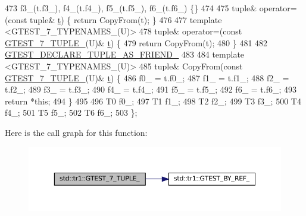 \begin{DoxyCode}
473       f3\_(t.f3\_), f4\_(t.f4\_), f5\_(t.f5\_), f6\_(t.f6\_) \{\}
474 
475   tuple& operator=(\textcolor{keyword}{const} tuple& \hyperlink{namespacebattery__monitor__node_a7a63d20d1ea461e280f4eb5b47f925cd}{t}) \{ \textcolor{keywordflow}{return} CopyFrom(t); \}
476 
477   \textcolor{keyword}{template} <GTEST\_7\_TYPENAMES\_(U)>
478   tuple& operator=(\textcolor{keyword}{const} \hyperlink{gtest-tuple_8h_a8987baf82ee028d1d778447413a02c0c}{GTEST\_7\_TUPLE\_}(U)& \hyperlink{namespacebattery__monitor__node_a7a63d20d1ea461e280f4eb5b47f925cd}{t}) \{
479     \textcolor{keywordflow}{return} CopyFrom(t);
480   \}
481 
482   \hyperlink{gtest-tuple_8h_a2b20671273f514a88a6e9b8328e5f257}{GTEST\_DECLARE\_TUPLE\_AS\_FRIEND\_}
483 
484   \textcolor{keyword}{template} <GTEST\_7\_TYPENAMES\_(U)>
485   tuple& CopyFrom(\textcolor{keyword}{const} \hyperlink{gtest-tuple_8h_a8987baf82ee028d1d778447413a02c0c}{GTEST\_7\_TUPLE\_}(U)& \hyperlink{namespacebattery__monitor__node_a7a63d20d1ea461e280f4eb5b47f925cd}{t}) \{
486     f0\_ = t.f0\_;
487     f1\_ = t.f1\_;
488     f2\_ = t.f2\_;
489     f3\_ = t.f3\_;
490     f4\_ = t.f4\_;
491     f5\_ = t.f5\_;
492     f6\_ = t.f6\_;
493     \textcolor{keywordflow}{return} *\textcolor{keyword}{this};
494   \}
495 
496   T0 f0\_;
497   T1 f1\_;
498   T2 f2\_;
499   T3 f3\_;
500   T4 f4\_;
501   T5 f5\_;
502   T6 f6\_;
503 \};
\end{DoxyCode}
Here is the call graph for this function\+:
\nopagebreak
\begin{figure}[H]
\begin{center}
\leavevmode
\includegraphics[width=350pt]{namespacestd_1_1tr1_ab451b390a95ee0555d7a43b67ea348aa_cgraph}
\end{center}
\end{figure}
\mbox{\label{namespacestd_1_1tr1_a61277f5af24b20fce87a9fd94307ab34}} 
